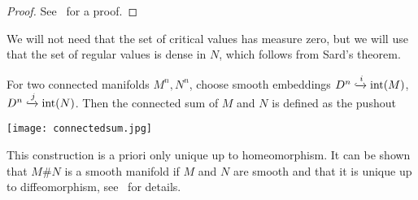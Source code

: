 \documentclass[a4paper,11pt]{article}
\begin{document}
\begin{proof}
    See\ \cite{lee} for a proof.
\end{proof}

\begin{remark}
    We will not need that the set of critical values has measure zero, but we will use that the set of regular values is dense in \(N\), which follows from Sard's theorem.
\end{remark}

\begin{definition}
    For two connected manifolds \(M^n,N^n\), choose smooth embeddings \(D^n\xhookrightarrow{i}\mathrm{int}(M)\), \(D^n\xhookrightarrow{j}\mathrm{int}(N)\). Then the connected sum of \(M\) and \(N\) is defined as the pushout %
    \begin{center}
    \end{center}
    \begin{center}
        \texttt{[image: connectedsum.jpg]}
    \end{center}
\end{definition}

\begin{remark}
    This construction is a priori only unique up to homeomorphism. It can be shown that \(M\#N\) is a smooth manifold if \(M\) and \(N\) are smooth and that it is unique up to diffeomorphism, see\ \cite[VI, Theorem 1.1.]{kosinski} for details.
\end{remark}


\end{document}
